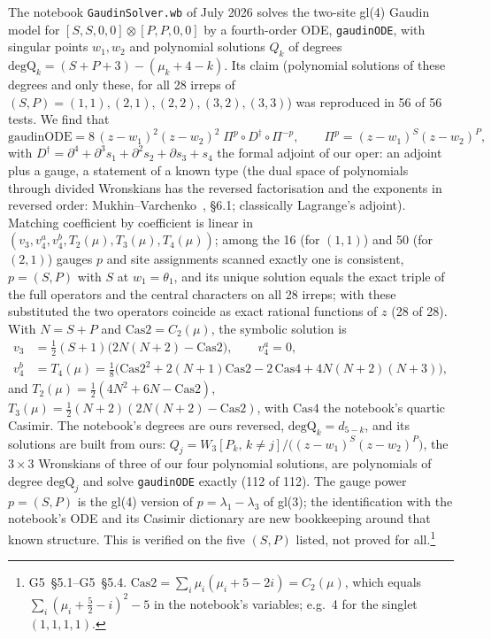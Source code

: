 \documentclass[11pt]{article}
\newcommand{\rg}[2]{\textsf{G#1}~\S#2}
\begin{document}
The notebook \texttt{GaudinSolver.wb} of July 2026 solves the two-site gl(4) Gaudin model for $[S,S,0,0]\otimes[P,P,0,0]$ by a fourth-order ODE, \texttt{gaudinODE}, with singular points $w_1,w_2$ and polynomial solutions $Q_k$ of degrees $\mathrm{degQ}_k=(S+P+3)-(\mu_k+4-k)$.
Its claim (polynomial solutions of these degrees and only these, for all 28 irreps of $(S,P)=(1,1),(2,1),(2,2),(3,2),(3,3)$) was reproduced in 56 of 56 tests.
We find that
\begin{equation}\label{eq:july}
\mathrm{gaudinODE}=8\,(z-w_1)^2(z-w_2)^2\;\Pi^{p}\circ D^{\dagger}\circ\Pi^{-p},\qquad\Pi^{p}=(z-w_1)^{S}(z-w_2)^{P},
\end{equation}
with $D^\dagger=\partial^4+\partial^3s_1+\partial^2s_2+\partial s_3+s_4$ the formal adjoint of our oper: an adjoint plus a gauge, a statement of a known type (the dual space of polynomials through divided Wronskians has the reversed factorisation and the exponents in reversed order: Mukhin--Varchenko~\cite{mvdual}, \S6.1; classically Lagrange's adjoint).
Matching coefficient by coefficient is linear in $(v_3,v_4^a,v_4^b,T_2(\mu),T_3(\mu),T_4(\mu))$; among the 16 (for $(1,1)$) and 50 (for $(2,1)$) gauges $p$ and site assignments scanned exactly one is consistent, $p=(S,P)$ with $S$ at $w_1=\theta_1$, and its unique solution equals the exact triple of the full operators and the central characters on all 28 irreps; with these substituted the two operators coincide as exact rational functions of $z$ (28 of 28).
With $N=S+P$ and $\mathrm{Cas2}=C_2(\mu)$, the symbolic solution is
\begin{equation}\label{eq:dictjuly}
\begin{aligned}
v_3&=\tfrac12(S+1)\big(2N(N+2)-\mathrm{Cas2}\big),\qquad v_4^a=0,\\
v_4^b&=T_4(\mu)=\tfrac18\big(\mathrm{Cas2}^2+2(N+1)\mathrm{Cas2}-2\,\mathrm{Cas4}+4N(N+2)(N+3)\big),
\end{aligned}
\end{equation}
and $T_2(\mu)=\tfrac12(4N^2+6N-\mathrm{Cas2})$, $T_3(\mu)=\tfrac12(N+2)(2N(N+2)-\mathrm{Cas2})$, with $\mathrm{Cas4}$ the notebook's quartic Casimir.
The notebook's degrees are ours reversed, $\mathrm{degQ}_k=d_{5-k}$, and its solutions are built from ours: $Q_j=W_3[P_k,\,k\ne j]\big/\big((z-w_1)^S(z-w_2)^P\big)$, the $3\times3$ Wronskians of three of our four polynomial solutions, are polynomials of degree $\mathrm{degQ}_j$ and solve \texttt{gaudinODE} exactly (112 of 112).
The gauge power $p=(S,P)$ is the gl(4) version of $p=\lambda_1-\lambda_3$ of gl(3); the identification with the notebook's ODE and its Casimir dictionary are new bookkeeping around that known structure.
This is verified on the five $(S,P)$ listed, not proved for all.\footnote{\rg{5}{5.1}--\rg{5}{5.4}. $\mathrm{Cas2}=\sum_i\mu_i(\mu_i+5-2i)=C_2(\mu)$, which equals $\sum_i(\mu_i+\tfrac52-i)^2-5$ in the notebook's variables; e.g.\ 4 for the singlet $(1,1,1,1)$.}
\end{document}
